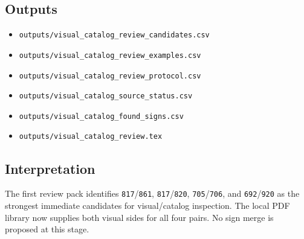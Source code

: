 \subsection{Outputs}

\begin{itemize}
  \item \texttt{outputs/visual\_catalog\_review\_candidates.csv}
  \item \texttt{outputs/visual\_catalog\_review\_examples.csv}
  \item \texttt{outputs/visual\_catalog\_review\_protocol.csv}
  \item \texttt{outputs/visual\_catalog\_source\_status.csv}
  \item \texttt{outputs/visual\_catalog\_found\_signs.csv}
  \item \texttt{outputs/visual\_catalog\_review.tex}
\end{itemize}

\subsection{Interpretation}

The first review pack identifies \texttt{817}/\texttt{861}, \texttt{817}/\texttt{820}, \texttt{705}/\texttt{706}, and \texttt{692}/\texttt{920} as the strongest immediate candidates for visual/catalog inspection. The local PDF library now supplies both visual sides for all four pairs. No sign merge is proposed at this stage.
